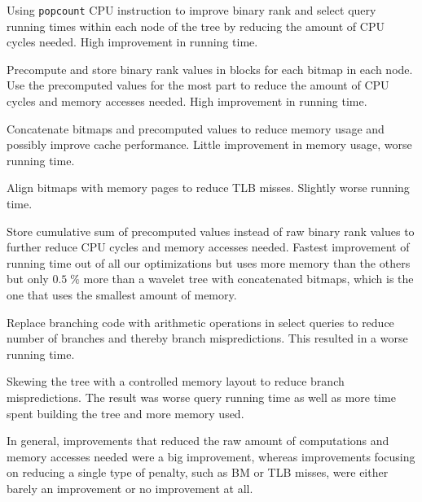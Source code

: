 \begin{description*}
\item[Using \texttt{popcount} CPU instruction] to improve binary rank and select query running times within each node of the tree by reducing the amount of CPU cycles needed. High improvement in running time. 
\item[Precompute and store binary rank values] in blocks for each bitmap in each node. Use the precomputed values for the most part to reduce the amount of CPU cycles and memory accesses needed. High improvement in running time.
\item[Concatenate bitmaps and precomputed values] to reduce memory usage and possibly improve cache performance. Little improvement in memory usage, worse running time.
\item[Align bitmaps with memory pages] to reduce TLB misses. Slightly worse running time.
\item[Store cumulative sum of precomputed values] instead of raw binary rank values to further reduce CPU cycles and memory accesses needed. Fastest improvement of running time out of all our optimizations but uses more memory than the others but only $0.5\;\%$ more than a wavelet tree with concatenated bitmaps, which is the one that uses the smallest amount of memory.
\item[Replace branching code with arithmetic operations] in select queries to reduce number of branches and thereby branch mispredictions. This resulted in a worse running time.
\item[Skewing the tree] with a controlled memory layout to reduce branch mispredictions. The result was worse query running time as well as more time spent building the tree and more memory used.
\end{description*}

In general, improvements that reduced the raw amount of computations and memory accesses needed were a big improvement, whereas improvements focusing on reducing a single type of penalty, such as BM or TLB misses, were either barely an improvement or no improvement at all.